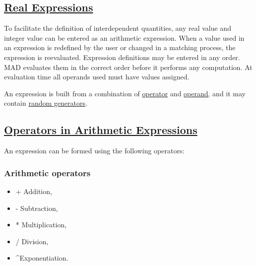 




\subsection{\href{expression}{ Real Expressions}}

  To facilitate the definition of interdependent quantities, any real value and integer value can be entered as an arithmetic expression. When a value used in an expression is redefined by the user or changed in a matching process, the expression is reevaluated. Expression definitions may be entered in any order. MAD evaluates them in the correct order before it performs any computation. At evaluation time all operands used must have values assigned. 

 An expression is built from a combination of \hyperlink{operator}{operator} and \hyperlink{operand}{operand}, and it may contain \hyperlink{random}{random generators}.  

\subsection{\href{operator}{ Operators in Arithmetic Expressions}} An expression can be formed using the following operators: 

\subsubsection{Arithmetic operators}
\begin{itemize}
	\item + Addition, 
	\item - Subtraction, 
	\item * Multiplication, 
	\item / Division, 
	\item \textasciicircum Exponentiation. 
\end{itemize}

